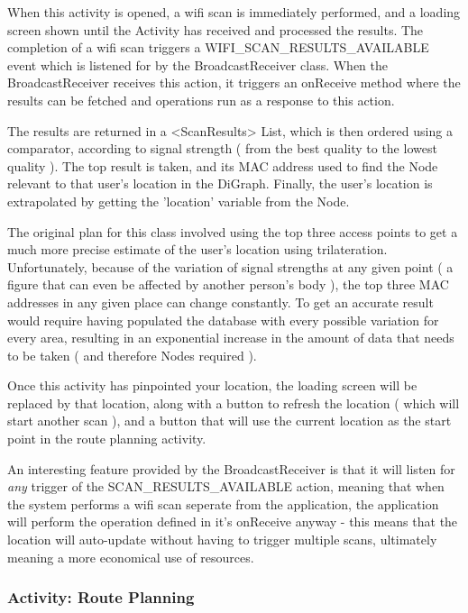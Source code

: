 \documentclass[11pt]{informatics-report}
\begin{document}
When this activity is opened, a wifi scan is immediately performed, and a loading screen shown until the Activity has received and processed the results. The completion of a wifi scan triggers a WIFI\_SCAN\_RESULTS\_AVAILABLE event which is listened for by the BroadcastReceiver class. When the BroadcastReceiver receives this action, it triggers an onReceive method where the results can be fetched and operations run as a response to this action.

The results are returned in a <ScanResults> List, which is then ordered using a comparator, according to signal strength ( from the best quality to the lowest quality ). The top result is taken, and its MAC address used to find the Node relevant to that user's location in the DiGraph. Finally, the user's location is extrapolated by getting the 'location' variable from the Node.

The original plan for this class involved using the top three access points to get a much more precise estimate of the user's location using trilateration. Unfortunately, because of the variation of signal strengths at any given point ( a figure that can even be affected by another person's body ), the top three MAC addresses in any given place can change constantly. To get an accurate result would require having populated the database with every possible variation for every area, resulting in an exponential increase in the amount of data that needs to be taken ( and therefore Nodes required ). 

Once this activity has pinpointed your location, the loading screen will be replaced by that location, along with a button to refresh the location ( which will start another scan ), and a button that will use the current location as the start point in the route planning activity.

An interesting feature provided by the BroadcastReceiver is that it will listen for \textit{any} trigger of the SCAN\_RESULTS\_AVAILABLE action, meaning that when the system performs a wifi scan seperate from the application, the application will perform the operation defined in it's onReceive anyway - this means that the location will auto-update without having to trigger multiple scans, ultimately meaning a more economical use of resources.

\subsubsection{Activity: Route Planning}
\end{document}
